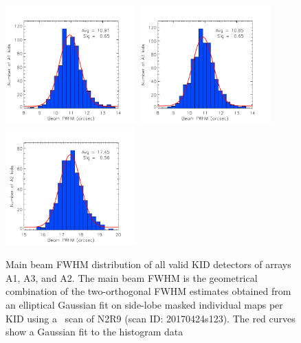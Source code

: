 \begin{figure}[ht!]
  \centering
  \includegraphics[clip=true,width=0.45\textwidth]{Figures/Papier2017/plot_histo_A1_fwhm_20170424s123.pdf}
  \includegraphics[clip=true,width=0.45\textwidth]{Figures/Papier2017/plot_histo_A3_fwhm_20170424s123.pdf}
  \includegraphics[clip=true,width=0.45\textwidth]{Figures/Papier2017/plot_histo_A2_fwhm_20170424s123.pdf}
  
\caption[Main beam FWHM distribution across the array]{Main beam FWHM
  distribution of all valid KID detectors of arrays A1, A3, and
  A2. The main beam FWHM is the geometrical combination of the
  two-orthogonal FWHM estimates obtained from an elliptical Gaussian
  fit on side-lobe masked individual maps per KID using a \bm\ scan of
  N2R9 (scan ID: 20170424s123). The red curves show a Gaussian fit to
  the histogram data}
  \label{fig:focalplane_histo}
\end{figure}

